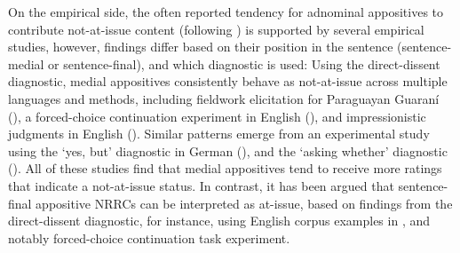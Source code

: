 \documentclass[times,linguex,xcolor]{glossa}
\begin{document}
  On the empirical side, the often reported tendency for adnominal appositives to contribute not-at-issue content (following \citealt{potts_logic_2005}) is supported by several empirical studies, however, findings differ based on their position in the sentence (sentence-medial or sentence-final), and which diagnostic is used:
  Using the direct-dissent diagnostic, medial appositives consistently behave as not-at-issue across multiple languages and methods, including fieldwork elicitation for Paraguayan Guaraní (\citealt{tonhauser_diagnosing_2012}), a forced-choice continuation experiment in English (\citealt{syrett_experimental_2015}), and impressionistic judgments in English (\citealt{potts_logic_2005,amaral_review_2007}). Similar patterns emerge from an experimental study using the ‘yes, but’ diagnostic in German (\citealt{destruel_cross-linguistic_2015}), and the `asking whether' diagnostic (\citealt{tonhauser_how_2018,solstad_cataphoric_2024}). All of these studies find that medial appositives tend to receive more ratings that indicate a not-at-issue status. In contrast, it has been argued that sentence-final appositive NRRCs can be interpreted as at-issue, based on findings from the direct-dissent diagnostic, for instance, using English corpus examples in \citealt{anderbois_at-issue_2015}, and notably  forced-choice continuation task experiment.
\end{document}
